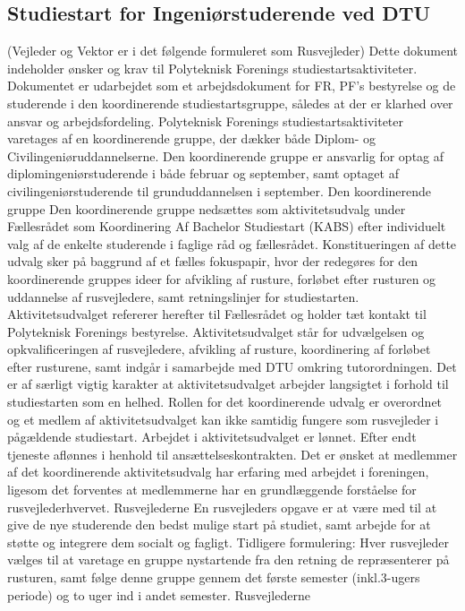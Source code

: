 \subsection{Studiestart for Ingeniørstuderende ved DTU}
(Vejleder og Vektor er i det følgende formuleret som Rusvejleder)
Dette dokument indeholder ønsker og krav til Polyteknisk Forenings studiestartsaktiviteter.
Dokumentet er udarbejdet som et arbejdsdokument for FR, PF’s bestyrelse og de studerende i
den koordinerende studiestartsgruppe, således at der er klarhed over ansvar og arbejdsfordeling.
Polyteknisk Forenings studiestartsaktiviteter varetages af en koordinerende gruppe, der dækker
både Diplom- og Civilingeniøruddannelserne. Den koordinerende gruppe er ansvarlig for optag af
diplomingeniørstuderende i både februar og september, samt optaget af civilingeniørstuderende til grunduddannelsen i
september.
Den koordinerende gruppe
Den koordinerende gruppe nedsættes som aktivitetsudvalg under Fællesrådet som Koordinering Af Bachelor Studiestart
(KABS) efter individuelt valg af de enkelte studerende i faglige råd og fællesrådet. Konstitueringen af dette udvalg sker
på baggrund af et fælles fokuspapir, hvor der redegøres for den koordinerende gruppes ideer for afvikling af rusture,
forløbet efter rusturen og uddannelse af rusvejledere, samt retningslinjer for studiestarten. Aktivitetsudvalget refererer
herefter til Fællesrådet og holder tæt kontakt til Polyteknisk Forenings bestyrelse.
Aktivitetsudvalget står for udvælgelsen og opkvalificeringen af rusvejledere, afvikling af rusture,
koordinering af forløbet efter rusturene, samt indgår i samarbejde med DTU omkring tutorordningen. Det er af særligt
vigtig karakter at aktivitetsudvalget arbejder langsigtet i forhold til studiestarten som en helhed. Rollen for det
koordinerende udvalg er overordnet og et medlem af aktivitetsudvalget kan ikke samtidig fungere som rusvejleder i
pågældende studiestart.
Arbejdet i aktivitetsudvalget er lønnet. Efter endt tjeneste aflønnes i henhold til ansættelseskontrakten.
Det er ønsket at medlemmer af det koordinerende aktivitetsudvalg har erfaring med arbejdet i foreningen, ligesom det
forventes at medlemmerne har en grundlæggende forståelse for rusvejlederhvervet.
Rusvejlederne
En rusvejleders opgave er at være med til at give de nye studerende den bedst mulige start på studiet, samt arbejde for at
støtte og integrere dem socialt og fagligt.
Tidligere formulering:
Hver rusvejleder vælges til at varetage en gruppe nystartende fra den retning de repræsenterer på rusturen, samt følge
denne gruppe gennem det første semester (inkl.3-ugers periode) og to uger ind i andet semester. Rusvejlederne

